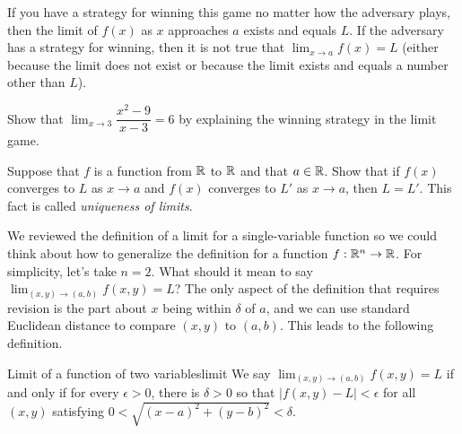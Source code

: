 \documentclass[prettycode,shellescape]{watsonbook}
\begin{document}
If you have a strategy for winning this game no matter how the
adversary plays, then the limit of $f(x)$ as $x$ approaches $a$ exists
and equals $L$. If the adversary has a strategy for winning, then it
is not true that $\lim_{x \to a} f(x) = L$ (either because the limit
does not exist or because the limit exists and equals a number other
than $L$).

\begin{exercise}{}{}
  Show that $\displaystyle{\lim_{x \to 3}}\dfrac{x^2 - 9}{x - 3} = 6$
  by explaining the winning strategy in the limit game.
\end{exercise}

\begin{exercise}{}{}
  Suppose that $f$ is a function from $\mathbb{R}$ to $\mathbb{R}$ and that
  $a \in \mathbb{R}$. Show that if $f(x)$ converges to $L$ as $x\to a$ and
  $f(x)$ converges to $L'$ as $x\to a$, then $L = L'$. This fact is
  called \textit{uniqueness of limits}.
\end{exercise}

We reviewed the definition of a limit for a single-variable function
so we could think about how to generalize the definition for a
function $f:\mathbb{R}^n \to \mathbb{R}$. For simplicity, let's take $n = 2$. What
should it mean to say
$\displaystyle{\lim_{(x,y) \to (a,b)} f(x,y)} = L$? The only aspect of
the definition that requires revision is the part about $x$ being
within $\delta$ of $a$, and we can use standard Euclidean distance to
compare $(x,y)$ to $(a,b)$. This leads to the following
definition.

\begin{defn}{Limit of a function of two variables}{limit}
  We say $\lim_{(x,y)\to (a,b)} f(x,y) = L$ if and only if for every
  $\epsilon > 0$, there is $\delta>0$ so that
  $|f(x,y) - L| < \epsilon$ for all $(x,y)$ satisfying
  $0 < \sqrt{(x -a)^2 + (y-b)^2} < \delta$.
\end{defn}

\newpage 
\end{document}
